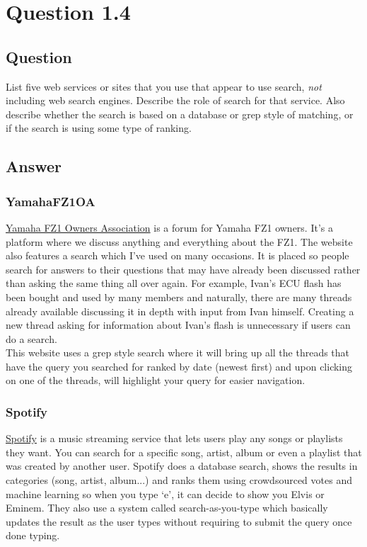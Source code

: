 \documentclass[10pt,letterpaper,bibliography=totoc]{scrartcl}
\begin{document}
\section{Question 1.4}
\subsection{Question}
List five web services or sites that you use that appear to use search, \textit{not} including
web search engines. Describe the role of search for that service. Also describe
whether the search is based on a database or grep style of matching, or if the search
is using some type of ranking.
\subsection{Answer}
\subsubsection{YamahaFZ1OA}
\href{www.yamahafz1oa.com}{Yamaha FZ1 Owners Association} is a forum for Yamaha FZ1 owners. It's a platform where we discuss anything and everything about the FZ1. The website also features a search which I've used on many occasions. It is placed so people search for answers to their questions that may have already been discussed rather than asking the same thing all over again. For example, Ivan's ECU flash has been bought and used by many members and naturally, there are many threads already available discussing it in depth with input from Ivan himself. Creating a new thread asking for information about Ivan's flash is unnecessary if users can do a search. \\

This website uses a grep style search where it will bring up all the threads that have the query you searched for ranked by date (newest first) and upon clicking on one of the threads, will highlight your query for easier navigation.

\subsubsection{Spotify}
\href{www.spotify.com}{Spotify} is a music streaming service that lets users play any songs or playlists they want. You can search for a specific song, artist, album or even a playlist that was created by another user. Spotify does a database search, shows the results in categories (song, artist, album...) and ranks them using crowdsourced votes and machine learning so when you type `e', it can decide to show you Elvis or Eminem. They also use a system called search-as-you-type\cite{search-as-you-type} which basically updates the result as the user types without requiring to submit the query once done typing. 
\end{document}
